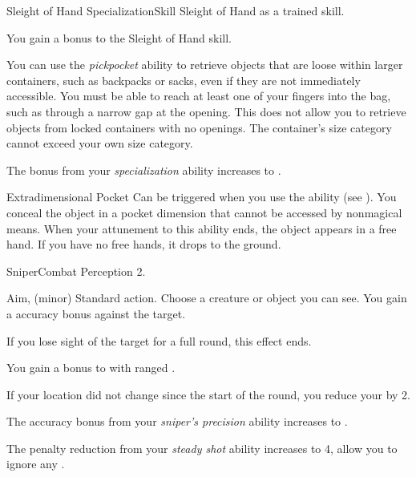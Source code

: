   \begin{feat}{Sleight of Hand Specialization}{Skill}
    \featpre Sleight of Hand as a trained skill.

     You gain a  bonus to the Sleight of Hand skill.

     You can use the \textit{pickpocket} ability to retrieve objects that are loose within larger containers, such as backpacks or sacks, even if they are not immediately accessible.
    You must be able to reach at least one of your fingers into the bag, such as through a narrow gap at the opening.
    This does not allow you to retrieve objects from locked containers with no openings.
    The container's size category cannot exceed your own size category.

     The bonus from your \textit{specialization} ability increases to .

    \begin{magicalattuneability}{Extradimensional Pocket}{}
      \abilityusagetime Can be triggered when you use the  ability (see ).
      \rankline
      You conceal the object in a pocket dimension that cannot be accessed by nonmagical means.
      When your attunement to this ability ends, the object appears in a free hand.
      If you have no free hands, it drops to the ground.
    \end{magicalattuneability}
  \end{feat}

  \begin{feat}{Sniper}{Combat}
    \featpre Perception 2.

    \begin{sustainability}{Aim}{,  (minor)}
      \abilityusagetime Standard action.
      \rankline
      Choose a creature or object you can see.
      You gain a  accuracy bonus against the target.

      If you lose sight of the target for a full round, this effect ends.
    \end{sustainability}

     You gain a  bonus to  with ranged .

     If your location did not change since the start of the round, you reduce your  by 2.

     The accuracy bonus from your \textit{sniper's precision} ability increases to .

     The penalty reduction from your \textit{steady shot} ability increases to 4, allow you to ignore any .
  \end{feat}

